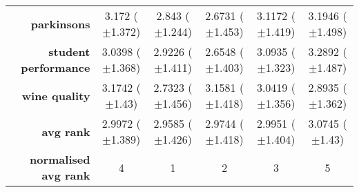 \begin{table}[htb]
{\begin{tabular}{r|ccccc}
                  \textbf{parkinsons}          & \cellcolor[rgb]{ .984,  .561,  .451}3.172 ($\pm$1.372)  & \cellcolor[rgb]{ .62,  .812,  .494}2.843 ($\pm$1.244)   & \cellcolor[rgb]{ .388,  .745,  .482}2.6731 ($\pm$1.453) & \cellcolor[rgb]{ 1,  .922,  .518}3.1172 ($\pm$1.419)    & \cellcolor[rgb]{ .973,  .412,  .42}3.1946 ($\pm$1.498)  \\
                  \textbf{student performance} & \cellcolor[rgb]{ 1,  .922,  .518}3.0398 ($\pm$1.368)    & \cellcolor[rgb]{ .812,  .867,  .506}2.9226 ($\pm$1.411) & \cellcolor[rgb]{ .388,  .745,  .482}2.6548 ($\pm$1.403) & \cellcolor[rgb]{ .996,  .812,  .498}3.0935 ($\pm$1.323) & \cellcolor[rgb]{ .973,  .412,  .42}3.2892 ($\pm$1.487)  \\
                  \textbf{wine quality}        & \cellcolor[rgb]{ .973,  .412,  .42}3.1742 ($\pm$1.43)   & \cellcolor[rgb]{ .388,  .745,  .482}2.7323 ($\pm$1.456) & \cellcolor[rgb]{ .976,  .475,  .435}3.1581 ($\pm$1.418) & \cellcolor[rgb]{ 1,  .922,  .518}3.0419 ($\pm$1.356)    & \cellcolor[rgb]{ .706,  .835,  .498}2.8935 ($\pm$1.362) \\
                  \midrule
                  \textbf{avg rank}            & \cellcolor[rgb]{ 1,  .91,  .518}2.9972 ($\pm$1.389)     & \cellcolor[rgb]{ .388,  .745,  .482}2.9585 ($\pm$1.426) & \cellcolor[rgb]{ .651,  .82,  .494}2.9744 ($\pm$1.418)  & \cellcolor[rgb]{ 1,  .922,  .518}2.9951 ($\pm$1.404)    & \cellcolor[rgb]{ .973,  .412,  .42}3.0745 ($\pm$1.43)   \\
                  \midrule
                  \textbf{normalised avg rank} & \cellcolor[rgb]{ .988,  .667,  .471}4                   & \cellcolor[rgb]{ .388,  .745,  .482}1                   & \cellcolor[rgb]{ .694,  .831,  .498}2                   & \cellcolor[rgb]{ 1,  .922,  .518}3                      & \cellcolor[rgb]{ .973,  .412,  .42}5                    \\
            \end{tabular}%

      }
\end{table}%


